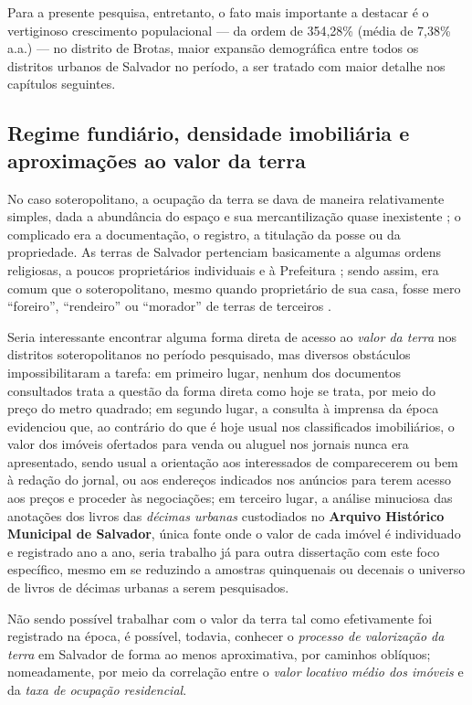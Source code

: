 Para a presente pesquisa, entretanto, o fato mais importante a destacar é o vertiginoso crescimento populacional --- da ordem de 354,28\% (média de 7,38\% a.a.) --- no distrito de Brotas, maior expansão demográfica entre todos os distritos urbanos de Salvador no período, a ser tratado com maior detalhe nos capítulos seguintes.

\subsection{Regime fundiário, densidade imobiliária e aproximações ao valor da terra}\label{subsubsec:polfundvalter}

No caso soteropolitano, a ocupação da terra se dava de maneira relativamente simples, dada a abundância do espaço e sua mercantilização quase inexistente \cite[p.~25]{MOURA1990}; o complicado era a documentação, o registro, a titulação da posse ou da propriedade. As terras de Salvador pertenciam basicamente a algumas ordens religiosas, a poucos proprietários individuais e à Prefeitura \cite{CEDURB1978}; sendo assim, era comum que o soteropolitano, mesmo quando proprietário de sua casa, fosse mero ``foreiro'', ``rendeiro'' ou ``morador'' de terras de terceiros \cite[p.~139]{BRANDAO1980}. 

Seria interessante encontrar alguma forma direta de acesso ao \textit{valor da terra} nos distritos soteropolitanos no período pesquisado, mas diversos obstáculos impossibilitaram a tarefa: em primeiro lugar, nenhum dos documentos consultados trata a questão da forma direta como hoje se trata, por meio do preço do metro quadrado; em segundo lugar, a consulta à imprensa da época evidenciou que, ao contrário do que é hoje usual nos classificados imobiliários, o valor dos imóveis ofertados para venda ou aluguel nos jornais nunca era apresentado, sendo usual a orientação aos interessados de comparecerem ou bem à redação do jornal, ou aos endereços indicados nos anúncios para terem acesso aos preços e proceder às negociações; em terceiro lugar, a análise minuciosa das anotações dos livros das \textit{décimas urbanas} custodiados no \textbf{Arquivo Histórico Municipal de Salvador}, única fonte onde o valor de cada imóvel é individuado e registrado ano a ano, seria trabalho já para outra dissertação com este foco específico, mesmo em se reduzindo a amostras quinquenais ou decenais o universo de livros de décimas urbanas a serem pesquisados.

Não sendo possível trabalhar com o valor da terra tal como efetivamente foi registrado na época, é possível, todavia, conhecer o \textit{processo de valorização da terra} em Salvador de forma ao menos aproximativa, por caminhos oblíquos; nomeadamente, por meio da correlação entre o \textit{valor locativo médio dos imóveis} e da \textit{taxa de ocupação residencial}.

